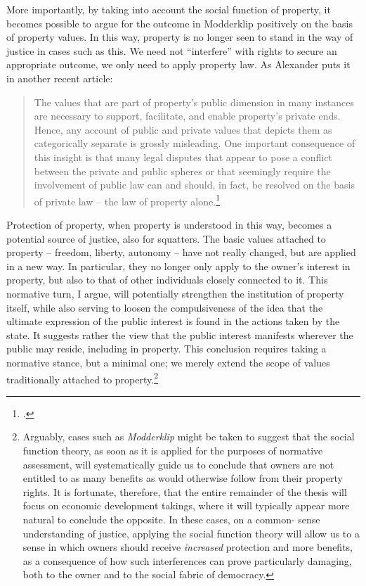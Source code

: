 More importantly, by taking into account the social function of property, it becomes possible to argue for the outcome in Modderklip positively on the basis of property values. In this way, property is no longer seen to stand in the way of justice in cases such as this. We need not ``interfere'' with rights to secure an appropriate outcome, we only need to apply property law. As Alexander puts it in another recent article: 

\begin{quote} The values that are
part of property's public dimension in many instances are necessary
to support, facilitate, and enable property's private ends.
Hence, any account of public and private values that depicts them as categorically
separate is grossly misleading. One important consequence of this
insight is that many legal disputes that appear to pose a conflict between
the private and public spheres or that seemingly
require the involvement of public law can and
should, in fact, be resolved on the basis of private law -- the law
of property alone.\footcite[1295-1296]{alexander14} \end{quote}

Protection of property, when property is understood in this way, becomes a potential source of justice, also for squatters. The basic values attached to property -- freedom, liberty, autonomy -- have not really changed, but are applied in a new way. In particular, they no longer only apply to the owner's interest in property, but also to that of other individuals closely connected to it. This normative turn, I argue, will potentially strengthen the institution of property itself, while also serving to loosen the compulsiveness of the idea that the ultimate expression of the public interest is found in the actions taken by the state. It suggests rather the view that the public interest manifests wherever the public may reside, including in property. This conclusion requires taking a normative stance, but a minimal one; we merely extend the scope of values traditionally attached to property.\footnote{Arguably, cases such as {\it Modderklip} might be taken to suggest that the social function theory, as soon as it is applied for the purposes of normative assessment, will systematically guide us to conclude that owners are not entitled to as many benefits as would otherwise follow from their property rights. It is fortunate, therefore, that the entire remainder of the thesis will focus on economic development takings, where it will typically appear more natural to conclude the opposite. In these cases, on a common- sense understanding of justice, applying the social function theory will allow us to  a sense in which owners should receive {\it increased} protection and more benefits, as a consequence of how such interferences can prove particularly damaging, both to the owner and to the social fabric of democracy.} 

